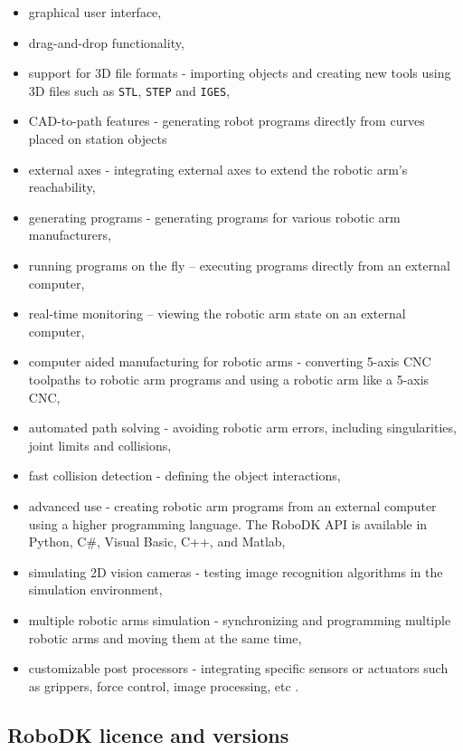 \begin{itemize}
\item graphical user interface,
\item drag-and-drop functionality, 
\item support for 3D file formats - importing objects and creating new tools using 3D files such as \texttt{STL}, \texttt{STEP} and \texttt{IGES},
\item CAD-to-path features - generating robot programs directly from curves placed on station objects 
\item external axes - integrating external axes to extend the robotic arm’s reachability,
\item generating programs - generating programs for various robotic arm manufacturers,
\item running programs on the fly – executing programs directly from an external computer,
\item real-time monitoring – viewing the robotic arm state on an external computer,
\item computer aided manufacturing for robotic arms - converting 5-axis CNC toolpaths to robotic arm programs and using a robotic arm like a 5-axis CNC,
\item automated path solving - avoiding robotic arm errors, including singularities, joint limits and collisions,
\item fast collision detection - defining the object interactions, 
\item advanced use - creating robotic arm programs from an external computer using a higher programming language. The RoboDK API is available in Python, C\#, Visual Basic, C++, and Matlab,
\item simulating 2D vision cameras - testing image recognition algorithms in the simulation environment,
\item multiple robotic arms simulation - synchronizing and programming multiple robotic arms and moving them at the same time, 
\item customizable post processors - integrating specific sensors or actuators such as grippers, force control, image processing, etc \cite{robodkfeatures}.
\end{itemize}

\subsection{RoboDK licence and versions}

